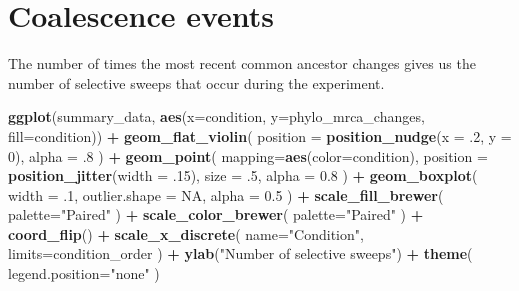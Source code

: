 \documentclass[]{book}
\newenvironment{Shaded}{\begin{snugshade}}{\end{snugshade}}
\newcommand{\DataTypeTok}[1]{\textcolor[rgb]{0.13,0.29,0.53}{#1}}
\newcommand{\DecValTok}[1]{\textcolor[rgb]{0.00,0.00,0.81}{#1}}
\newcommand{\FloatTok}[1]{\textcolor[rgb]{0.00,0.00,0.81}{#1}}
\newcommand{\KeywordTok}[1]{\textcolor[rgb]{0.13,0.29,0.53}{\textbf{#1}}}
\newcommand{\NormalTok}[1]{#1}
\newcommand{\OperatorTok}[1]{\textcolor[rgb]{0.81,0.36,0.00}{\textbf{#1}}}
\newcommand{\OtherTok}[1]{\textcolor[rgb]{0.56,0.35,0.01}{#1}}
\newcommand{\StringTok}[1]{\textcolor[rgb]{0.31,0.60,0.02}{#1}}
\begin{document}
\hypertarget{coalescence-events}{%
\section{Coalescence events}\label{coalescence-events}}

The number of times the most recent common ancestor changes gives us the number of selective sweeps that occur during the experiment.

\begin{Shaded}
\begin{Highlighting}[]
\KeywordTok{ggplot}\NormalTok{(summary_data, }\KeywordTok{aes}\NormalTok{(}\DataTypeTok{x=}\NormalTok{condition, }\DataTypeTok{y=}\NormalTok{phylo_mrca_changes, }\DataTypeTok{fill=}\NormalTok{condition)) }\OperatorTok{+}
\StringTok{  }\KeywordTok{geom_flat_violin}\NormalTok{(}
    \DataTypeTok{position =} \KeywordTok{position_nudge}\NormalTok{(}\DataTypeTok{x =} \FloatTok{.2}\NormalTok{, }\DataTypeTok{y =} \DecValTok{0}\NormalTok{),}
    \DataTypeTok{alpha =} \FloatTok{.8}
\NormalTok{  ) }\OperatorTok{+}
\StringTok{  }\KeywordTok{geom_point}\NormalTok{(}
    \DataTypeTok{mapping=}\KeywordTok{aes}\NormalTok{(}\DataTypeTok{color=}\NormalTok{condition),}
    \DataTypeTok{position =} \KeywordTok{position_jitter}\NormalTok{(}\DataTypeTok{width =} \FloatTok{.15}\NormalTok{),}
    \DataTypeTok{size =} \FloatTok{.5}\NormalTok{,}
    \DataTypeTok{alpha =} \FloatTok{0.8}
\NormalTok{  ) }\OperatorTok{+}
\StringTok{  }\KeywordTok{geom_boxplot}\NormalTok{(}
    \DataTypeTok{width =} \FloatTok{.1}\NormalTok{,}
    \DataTypeTok{outlier.shape =} \OtherTok{NA}\NormalTok{,}
    \DataTypeTok{alpha =} \FloatTok{0.5}
\NormalTok{  ) }\OperatorTok{+}
\StringTok{  }\KeywordTok{scale_fill_brewer}\NormalTok{(}
    \DataTypeTok{palette=}\StringTok{"Paired"}
\NormalTok{  ) }\OperatorTok{+}
\StringTok{  }\KeywordTok{scale_color_brewer}\NormalTok{(}
    \DataTypeTok{palette=}\StringTok{"Paired"}
\NormalTok{  ) }\OperatorTok{+}
\StringTok{  }\KeywordTok{coord_flip}\NormalTok{() }\OperatorTok{+}
\StringTok{  }\KeywordTok{scale_x_discrete}\NormalTok{(}
    \DataTypeTok{name=}\StringTok{"Condition"}\NormalTok{,}
    \DataTypeTok{limits=}\NormalTok{condition_order}
\NormalTok{  ) }\OperatorTok{+}
\StringTok{  }\KeywordTok{ylab}\NormalTok{(}\StringTok{"Number of selective sweeps"}\NormalTok{) }\OperatorTok{+}
\StringTok{  }\KeywordTok{theme}\NormalTok{(}
    \DataTypeTok{legend.position=}\StringTok{"none"}
\NormalTok{  )}
\end{Highlighting}
\end{Shaded}
\end{document}
